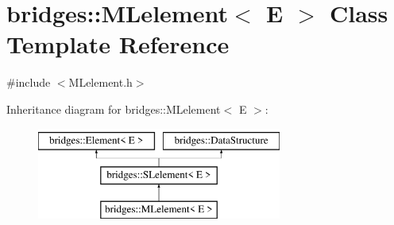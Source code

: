 \hypertarget{classbridges_1_1_m_lelement}{}\section{bridges\+::M\+Lelement$<$ E $>$ Class Template Reference}
\label{classbridges_1_1_m_lelement}


{\ttfamily \#include $<$M\+Lelement.\+h$>$}

Inheritance diagram for bridges\+::M\+Lelement$<$ E $>$\+:\begin{figure}[H]
\begin{center}
\leavevmode
\includegraphics[height=3.000000cm]{classbridges_1_1_m_lelement}
\end{center}
\end{figure}
